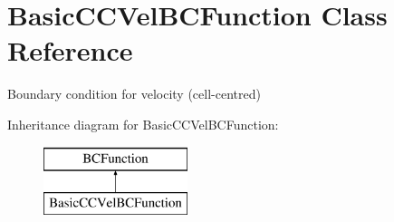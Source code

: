 \hypertarget{class_basic_c_c_vel_b_c_function}{\section{Basic\-C\-C\-Vel\-B\-C\-Function Class Reference}
\label{class_basic_c_c_vel_b_c_function}
}


Boundary condition for velocity (cell-\/centred)  


Inheritance diagram for Basic\-C\-C\-Vel\-B\-C\-Function\-:\begin{figure}[H]
\begin{center}
\leavevmode
\includegraphics[height=2.000000cm]{class_basic_c_c_vel_b_c_function}
\end{center}
\end{figure}
